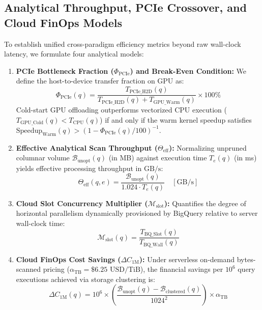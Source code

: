 \documentclass[10pt,a4paper]{article}
\begin{document}
\subsection{Analytical Throughput, PCIe Crossover, and Cloud FinOps Models}
To establish unified cross-paradigm efficiency metrics beyond raw wall-clock latency, we formulate four analytical models:
\begin{enumerate}[leftmargin=1.5em,itemsep=3pt]
    \item \textbf{PCIe Bottleneck Fraction ($\Phi_{\text{PCIe}}$) and Break-Even Condition:} We define the host-to-device transfer fraction on GPU as:
    \begin{equation}
        \Phi_{\text{PCIe}}(q) = \frac{T_{\text{PCIe\_H2D}}(q)}{T_{\text{PCIe\_H2D}}(q) + T_{\text{GPU\_Warm}}(q)} \times 100\%
    \end{equation}
    Cold-start GPU offloading outperforms vectorized CPU execution ($T_{\text{GPU\_Cold}}(q) < T_{\text{CPU}}(q)$) if and only if the warm kernel speedup satisfies $\text{Speedup}_{\text{Warm}}(q) > (1 - \Phi_{\text{PCIe}}(q)/100)^{-1}$.
    \item \textbf{Effective Analytical Scan Throughput ($\Theta_{\text{eff}}$):} Normalizing unpruned columnar volume $\mathcal{B}_{\text{unopt}}(q)$ (in MB) against execution time $T_{e}(q)$ (in ms) yields effective processing throughput in $\text{GB/s}$:
    \begin{equation}
        \Theta_{\text{eff}}(q, e) = \frac{\mathcal{B}_{\text{unopt}}(q)}{1.024 \cdot T_{e}(q)} \quad [\text{GB/s}]
    \end{equation}
    \item \textbf{Cloud Slot Concurrency Multiplier ($\mathcal{M}_{\text{slot}}$):} Quantifies the degree of horizontal parallelism dynamically provisioned by BigQuery relative to server wall-clock time:
    \begin{equation}
        \mathcal{M}_{\text{slot}}(q) = \frac{T_{\text{BQ\_Slot}}(q)}{T_{\text{BQ\_Wall}}(q)}
    \end{equation}
    \item \textbf{Cloud FinOps Cost Savings ($\Delta C_{\text{1M}}$):} Under serverless on-demand bytes-scanned pricing ($\alpha_{\text{TB}} = \$6.25\text{ USD/TiB}$), the financial savings per $10^6$ query executions achieved via storage clustering is:
    \begin{equation}
        \Delta C_{\text{1M}}(q) = 10^6 \times \left( \frac{\mathcal{B}_{\text{unopt}}(q) - \mathcal{B}_{\text{clustered}}(q)}{1024^2} \right) \times \alpha_{\text{TB}}
    \end{equation}
\end{enumerate}
\end{document}
